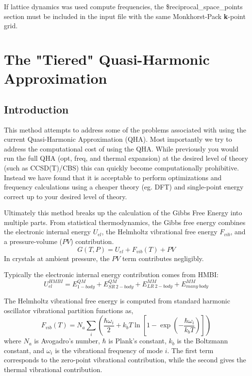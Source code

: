 \documentclass[11pt,letterpaper]{article}
\begin{document}
\begin{spacing}{1.0}
If lattice dynamics was used compute frequencies, the  \$reciprocal\_space\_points section  must be included in the input 
file with the same Monkhorst-Pack {\bf k}-point grid.


\section{The "Tiered" Quasi-Harmonic Approximation}

\subsection{Introduction}

This method attempts to address some of the problems associated with using the current Quasi-Harmonic Approximation (QHA). Most importantly we try to address the computational cost of using the QHA. While previously you would run the full QHA (opt, freq, and thermal expansion) at the desired level of theory (such as CCSD(T)/CBS) this can quickly become computationally prohibitive. Instead we have found that it is acceptable to perform optimizations and frequency calculations using a cheaper theory (eg. DFT) and single-point energy correct up to your desired level of theory.  

Ultimately this method breaks up the calculation of the Gibbs Free Energy into multiple parts. From statistical thermodynamics,
the Gibbs free energy combines the electronic internal energy
$U_{el}$, the Helmholtz vibrational free energy $F_{vib}$, and a
pressure-volume ($PV$) contribution.
\begin{equation}
\label{eq-gibbs}
G(T,P) =  U_{el} + F_{vib}(T) + PV
\end{equation}
In crystals at ambient pressure, the $PV$ term contributes negligibly.

Typically the electronic internal energy contribution comes from HMBI:
\begin{equation}
\label{eq-hmbi}
U_{el}^{HMBI} = E_{1-body}^{QM} + E_{SR\ 2-body}^{QM} + E_{LR\ 2-body}^{MM} +
E_{many\ body}^{MM}
\end{equation}

The Helmholtz vibrational free energy is computed from standard
harmonic oscillator vibrational partition functions as,
\begin{equation}
\label{eq-fvib}
F_{vib}(T) = N_a \sum_i {\left(\frac{\hbar \omega_i}{2} + k_b T \ln\left[1-\exp\left(-\frac{\hbar \omega_i}{k_b T}\right)\right]\right)}
\end{equation}
where $N_{a}$ is Avogadro's number, $\hbar$ is Plank's constant,
$k_{b}$ is the Boltzmann constant, and $\omega_{i}$ is the vibrational
frequency of mode $i$.  The first term corresponds to the zero-point
vibrational contribution, while the second gives the thermal
vibrational contribution.


\end{spacing}
\end{document}
